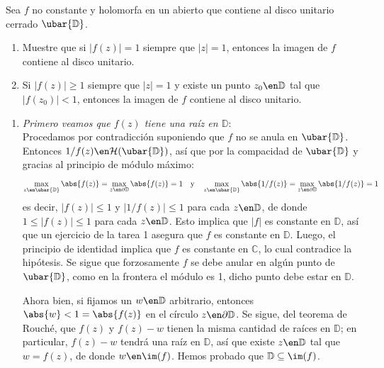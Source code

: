 \setcounter{eje}{16}
\begin{ejer}
Sea $f$ no constante y holomorfa en un abierto que contiene al disco unitario cerrado $\ubar{\mathbb{D}}$.
\begin{enumerate}[label=(\alph*),leftmargin=1.5em]
    \item Muestre que si $|f(z)|=1$ siempre que $|z|=1$, entonces la imagen de $f$ contiene al disco unitario.\par
    
    \item Si $|f(z)| \geq 1$ siempre que $|z|=1$ y existe un punto $z_0 \en \mathbb{D}$ tal que $|f(z_0)| < 1$, entonces la imagen de $f$ contiene al disco unitario.
\end{enumerate}
\end{ejer}
\begin{sol}\hphantom{r}
\begin{enumerate}[label=(\alph*),leftmargin=1.5em]
\item 
\emph{Primero veamos que $f(z)$ tiene una raíz en $\mathbb{D}$}:\\
Procedamos por contradicción suponiendo que $f$ no se anula en $\ubar{\mathbb{D}}$. Entonces $1/f(z) \en \mathcal{H}(\ubar{\mathbb{D}})$, así que por la compacidad de $\ubar{\mathbb{D}}$ y gracias al principio de módulo máximo:
\[
\max_{z\en\ubar{\mathbb{D}}} \abs{f(z)} = \max_{z\en\partial\mathbb{D}} \abs{f(z)} = 1
\quad\text{y}\quad
\max_{z\en\ubar{\mathbb{D}}} \abs{1/f(z)} = \max_{z\en\partial\mathbb{D}} \abs{1/f(z)} = 1
\]
es decir, $|f(z)| \le 1$ y $|1/f(z)| \le 1$ para cada $z\en\mathbb{D}$, de donde $1 \le |f(z)| \le 1$ para cada $z\en\mathbb{D}$. Esto implica que $|f|$ es constante en $\mathbb{D}$, así que un ejercicio de la tarea 1 asegura que $f$ es constante en $\mathbb{D}$. Luego, el principio de identidad implica que $f$ es constante en $\mathbb{C}$, lo cual contradice la hipótesis. Se sigue que forzosamente $f$ se debe anular en algún punto de $\ubar{\mathbb{D}}$, como en la frontera el módulo es 1, dicho punto debe estar en $\mathbb{D}$.\par
Ahora bien, si fijamos un $w\en\mathbb{D}$ arbitrario, entonces $\abs{w} < 1 = \abs{f(z)}$ en el círculo $z\en\partial\mathbb{D}$. Se sigue, del teorema de Rouché, que $f(z)$ y $f(z) - w$ tienen la misma cantidad de raíces en $\mathbb{D}$; en particular, $f(z) - w$ tendrá una raíz en $\mathbb{D}$, así que existe $z\en\mathbb{D}$ tal que $w = f(z) $, de donde $w\en\im(f)$. Hemos probado que $\mathbb{D} \subseteq \im(f)$.


\end{enumerate}
\end{sol}
